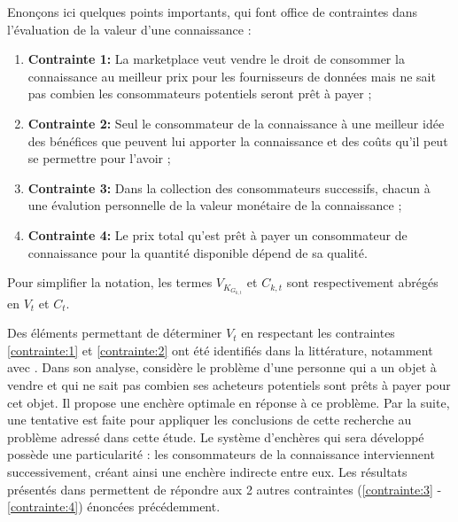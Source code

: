 Enonçons ici quelques points importants, qui font office de contraintes dans l'évaluation de la valeur d'une connaissance :
\begin{enumerate} 
    \item \textbf{Contrainte 1:} La marketplace veut vendre le droit de consommer la connaissance au meilleur prix pour les fournisseurs de données mais ne sait pas combien les consommateurs potentiels seront prêt à payer ; \label{contrainte:1}
    \item \textbf{Contrainte 2:} Seul le consommateur de la connaissance à une meilleur idée des bénéfices que peuvent lui apporter la connaissance et des coûts qu'il peut se permettre pour l'avoir ; \label{contrainte:2}
    \item \textbf{Contrainte 3:} Dans la collection des consommateurs successifs, chacun à une évalution personnelle de la valeur monétaire de la connaissance ; \label{contrainte:3}
    \item \textbf{Contrainte 4:} Le prix total qu'est prêt à payer un consommateur de connaissance pour la quantité disponible dépend de sa  qualité. \label{contrainte:4}
\end{enumerate}

Pour simplifier la notation, les termes $V_{K_{G_{k,t}}}$ et $C_{k,t}$ sont respectivement abrégés en $V_t$ et $C_t$.

Des éléments permettant de déterminer $V_t$ en respectant les contraintes \ref{contrainte:1} et \ref{contrainte:2} ont été identifiés dans la littérature, notamment avec \cite{myerson_optimal_1981}. Dans son analyse, \citeauthor{myerson_optimal_1981} considère le problème d'une personne qui a un objet à vendre et qui ne sait pas combien ses acheteurs potentiels sont prêts à payer pour cet objet. Il propose une enchère optimale en réponse à ce problème. Par la suite, une tentative est faite pour appliquer les conclusions de cette recherche au problème adressé dans cette étude. Le système d'enchères qui sera développé possède une particularité : les consommateurs de la connaissance interviennent successivement, créant ainsi une enchère indirecte entre eux. Les résultats présentés dans \cite{myerson_optimal_1981} permettent de répondre aux 2 autres contraintes (\ref{contrainte:3} - \ref{contrainte:4}) énoncées précédemment.

